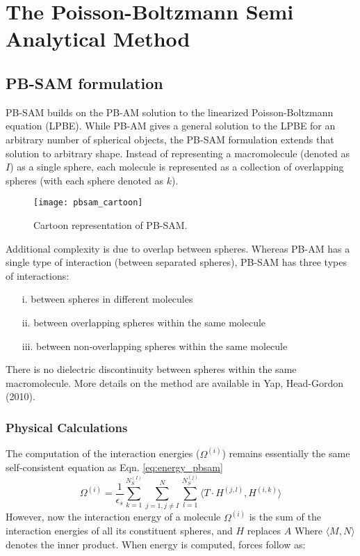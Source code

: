 \chapter{The Poisson-Boltzmann Semi Analytical Method}

\section{PB-SAM formulation}

PB-SAM builds on the PB-AM solution to the linearized Poisson-Boltzmann equation (LPBE). 
While PB-AM gives a general solution to the LPBE for an arbitrary number of spherical objects, 
the PB-SAM formulation extends that solution to arbitrary shape. 
Instead of representing a macromolecule (denoted as $I$) as a single sphere, 
each molecule is represented as a collection of overlapping spheres 
(with each sphere denoted as $k$). \\

\begin{figure}[!htbp]
  \centering
  \begin{minipage}[b]{0.65\textwidth}
    \texttt{[image: pbsam\_cartoon]}
    \caption{Cartoon representation of PB-SAM.}
    \label{fig:pbsam_cart}
  \end{minipage}
\end{figure}

Additional complexity is due to overlap between spheres. 
Whereas PB-AM has a single type of interaction (between separated spheres),
PB-SAM has three types of interactions:
\begin{itemize}
\item[i.     ]  between spheres in different molecules
\item[ii.    ]  between overlapping spheres within the same molecule
\item[iii.   ]  between non-overlapping spheres within the same molecule
\end{itemize}

There is no dielectric discontinuity 
between spheres within the same macromolecule. More details on the method are available in Yap, Head-Gordon (2010). \\

\subsection{Physical Calculations}

The computation of the interaction energies ($\Omega^{(i)}$) remains essentially the same self-consistent equation 
as Eqn. \ref{eq:energy_pbsam}
\begin{equation}
	\Omega^{(i)}=\frac{1}{\epsilon_s} \sum_{k=1}^{N_S^{(I)}}  \sum_{j=1, j\ne I}^{N} \sum_{l=1}^{N_S^{(j)}} 
		\langle  {{T}} \cdot {H}^{(j,l)} ,  {H}^{(i,k)} \rangle
	\label{eq:energy_pbsam}
\end{equation}
However, now the interaction energy of a molecule $\Omega^{(i)}$ is the sum of the 
interaction energies of all its constituent spheres, and \({H}\) replaces \({A}\) Where $\langle  M, N \rangle$ denotes the inner product. When energy is computed, forces follow as:

